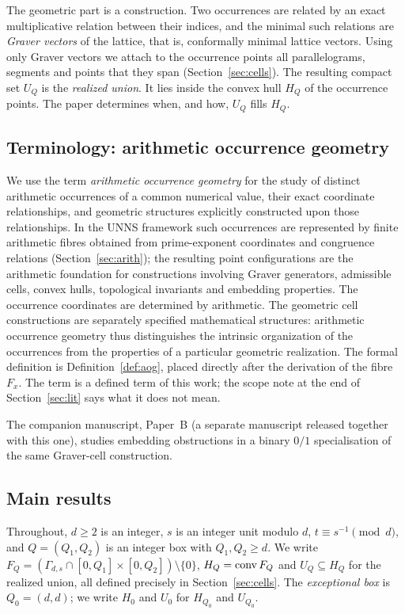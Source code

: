 The geometric part is a construction. Two occurrences are related by an exact multiplicative relation between their indices, and the minimal such relations are \emph{Graver vectors} of the lattice, that is, conformally minimal lattice vectors. Using only Graver vectors we attach to the occurrence points all parallelograms, segments and points that they span (Section~\ref{sec:cells}). The resulting compact set $U_Q$ is the \emph{realized union}. It lies inside the convex hull $H_Q$ of the occurrence points. The paper determines when, and how, $U_Q$ fills $H_Q$.

\subsection{Terminology: arithmetic occurrence geometry}\label{sec:terminology}

We use the term \emph{arithmetic occurrence geometry} for the study of distinct arithmetic occurrences of a common numerical value, their exact coordinate relationships, and geometric structures explicitly constructed upon those relationships. In the UNNS framework such occurrences are represented by finite arithmetic fibres obtained from prime-exponent coordinates and congruence relations (Section~\ref{sec:arith}); the resulting point configurations are the arithmetic foundation for constructions involving Graver generators, admissible cells, convex hulls, topological invariants and embedding properties. The occurrence coordinates are determined by arithmetic. The geometric cell constructions are separately specified mathematical structures: arithmetic occurrence geometry thus distinguishes the intrinsic organization of the occurrences from the properties of a particular geometric realization. The formal definition is Definition~\ref{def:aog}, placed directly after the derivation of the fibre $F_x$. The term is a defined term of this work; the scope note at the end of Section~\ref{sec:lit} says what it does not mean.

The companion manuscript, Paper~B (a separate manuscript released together with this one), studies embedding obstructions in a binary $0/1$ specialisation of the same Graver-cell construction.

\subsection{Main results}

Throughout, $d\ge 2$ is an integer, $s$ is an integer unit modulo $d$, $t\equiv s^{-1}\pmod d$, and $Q=(Q_1,Q_2)$ is an integer box with $Q_1,Q_2\ge d$. We write $F_Q=(\Gamma_{d,s}\cap[0,Q_1]\times[0,Q_2])\setminus\{0\}$, $H_Q=\operatorname{conv} F_Q$ and $U_Q\subseteq H_Q$ for the realized union, all defined precisely in Section~\ref{sec:cells}. The \emph{exceptional box} is $Q_0=(d,d)$; we write $H_0$ and $U_0$ for $H_{Q_0}$ and $U_{Q_0}$.


